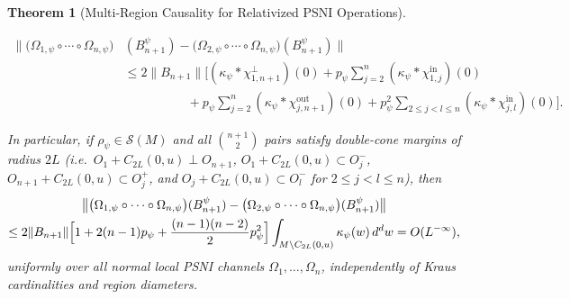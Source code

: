 \documentclass[11pt,a4paper]{article}
\newtheorem{theorem}{Theorem}[section]
\theoremstyle{definition}
\theoremstyle{remark}
\newcommand{\norm}[1]{\|#1\|}
\begin{document}
\begin{theorem}[Multi-Region Causality for Relativized PSNI Operations]
\begin{enumerate}[label=\textup{(\alph*)},leftmargin=*]
\begin{equation}\label{eq:psni-n}
\begin{aligned}
\bigl\|\bigl(\Omega_{1,\psi}\circ\cdots\circ\Omega_{n,\psi}\bigr)&(B_{n+1}^\psi) - \bigl(\Omega_{2,\psi}\circ\cdots\circ\Omega_{n,\psi}\bigr)(B_{n+1}^\psi)\bigr\| \\
&\le 2\norm{B_{n+1}}\Bigg[(\kappa_\psi*\chi^\perp_{1,n+1})(0)
+ p_\psi\sum_{j=2}^n(\kappa_\psi*\chi^{\mathrm{in}}_{1,j})(0) \\
&\qquad\qquad\quad
+ p_\psi\sum_{j=2}^n(\kappa_\psi*\chi^{\mathrm{out}}_{j,n+1})(0)
+ p_\psi^2\sum_{2\le j<l\le n}(\kappa_\psi*\chi^{\mathrm{in}}_{j,l})(0)\Bigg].
\end{aligned}
\end{equation}
\end{enumerate}
In particular, if $\rho_\psi\in\mathcal{S}(M)$ and all $\binom{n+1}{2}$ pairs satisfy double-cone margins of radius $2L$ (i.e.\ $O_1+C_{2L}(0,u)\perp O_{n+1}$, $O_1+C_{2L}(0,u)\subset O_j^-$, $O_{n+1}+C_{2L}(0,u)\subset O_j^+$, and $O_j+C_{2L}(0,u)\subset O_l^-$ for $2\le j<l\le n$), then
\begin{multline}\label{eq:psni-margin}
\bigl\|\bigl(\Omega_{1,\psi}\circ\cdots\circ\Omega_{n,\psi}\bigr)(B_{n+1}^\psi) - \bigl(\Omega_{2,\psi}\circ\cdots\circ\Omega_{n,\psi}\bigr)(B_{n+1}^\psi)\bigr\| \\
\le 2\norm{B_{n+1}}\Bigl[1 + 2(n-1)p_\psi + \frac{(n-1)(n-2)}{2}p_\psi^2\Bigr]\int_{M\setminus C_{2L}(0,u)}\kappa_\psi(w)\,d^dw
= O(L^{-\infty}),
\end{multline}
uniformly over all normal local PSNI channels $\Omega_1,\dots,\Omega_n$, independently of Kraus cardinalities and region diameters.
\end{theorem}
\end{document}
